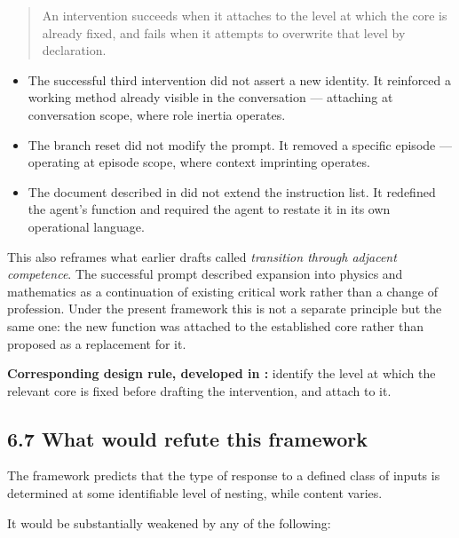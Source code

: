 \begin{quote}
An intervention succeeds when it attaches to the level at which the core is already fixed, and fails when it attempts to overwrite that level by declaration.
\end{quote}
\begin{itemize}
  \item The successful third intervention did not assert a new identity. It reinforced a working method already visible in the conversation — attaching at conversation scope, where role inertia operates.
  \item The branch reset did not modify the prompt. It removed a specific episode — operating at episode scope, where context imprinting operates.
  \item The document described in  did not extend the instruction list. It redefined the agent's function and required the agent to restate it in its own operational language.
\end{itemize}
This also reframes what earlier drafts called \emph{transition through adjacent competence}. The successful prompt described expansion into physics and mathematics as a continuation of existing critical work rather than a change of profession. Under the present framework this is not a separate principle but the same one: the new function was attached to the established core rather than proposed as a replacement for it.

\textbf{Corresponding design rule, developed in :} identify the level at which the relevant core is fixed before drafting the intervention, and attach to it.


\subsection*{6.7 What would refute this framework}
\label{sec:en:6.7}

The framework predicts that the type of response to a defined class of inputs is determined at some identifiable level of nesting, while content varies.

It would be substantially weakened by any of the following:

